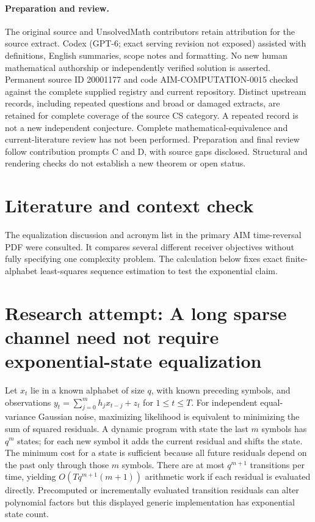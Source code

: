 \documentclass[11pt]{article}
\begin{document}
\paragraph{Preparation and review.}
The original source and UnsolvedMath contributors retain attribution for the source extract. Codex (GPT-6; exact serving revision not exposed) assisted with definitions, English summaries, scope notes and formatting. No new human mathematical authorship or independently verified solution is asserted. Permanent source ID 20001177 and code AIM-COMPUTATION-0015 checked against the complete supplied registry and current repository. Distinct upstream records, including repeated questions and broad or damaged extracts, are retained for complete coverage of the source CS category. A repeated record is not a new independent conjecture. Complete mathematical-equivalence and current-literature review has not been performed. Preparation and final review follow contribution prompts C and D, with source gaps disclosed. Structural and rendering checks do not establish a new theorem or open status.
\label{end:20001177}

\section{Literature and context check}
The equalization discussion and acronym list in the primary AIM time-reversal
PDF were consulted. It compares several different receiver objectives without
fully specifying one complexity problem. The calculation below fixes exact
finite-alphabet least-squares sequence estimation to test the exponential claim.
\section{Research attempt: A long sparse channel need not require exponential-state equalization}
Let $x_t$ lie in a known alphabet of size $q$, with known preceding symbols,
and observations
$y_t=\sum_{j=0}^m h_jx_{t-j}+z_t$ for $1\le t\le T$.
For independent equal-variance Gaussian noise, maximizing likelihood is
equivalent to minimizing the sum of squared residuals. A dynamic program with
state the last $m$ symbols has $q^m$ states; for each new symbol it adds the
current residual and shifts the state. The minimum cost for a state is sufficient
because all future residuals depend on the past only through those $m$ symbols.
There are at most $q^{m+1}$ transitions per time, yielding
$O(Tq^{m+1}(m+1))$ arithmetic work if each residual is evaluated directly.
Precomputed or incrementally evaluated transition residuals can alter polynomial
factors but this displayed generic implementation has exponential state count.
\end{document}

